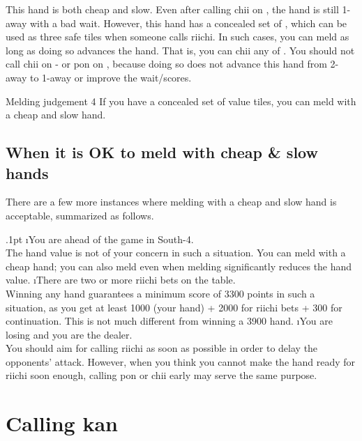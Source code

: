 \bigskip
This hand is both cheap and slow. Even after calling {\jap chii} on {\LARGE{}}, the hand is still 1-away with a bad wait. However, this hand has a concealed set of {\LARGE\zhong}, which can be used as three safe tiles when someone calls riichi. In such cases, you can meld as long as doing so advances the hand. That is, you can {\jap chii} any of {\LARGE{}}. You should not call {\jap chii} on {\LARGE{}-} or {\jap pon} on {\LARGE{}}, because doing so does not advance this hand from 2-away to 1-away or improve the wait/scores. 

\newpage
\color{MyRed}
\begin{itembox}[c]{Melding judgement 4}\normalcolor
If you have a concealed set of value tiles, you can meld with a cheap and slow hand.
\end{itembox}\normalcolor

\bigskip
\subsection{When it is OK to meld with cheap \& slow hands}
There are a few more instances where melding with a cheap and slow hand is acceptable, summarized as follows. 

\be\itemsep.1pt
\i You are ahead of the game in South-4.\\
The hand value is not of your concern in such a situation. You can meld with a cheap hand; you can also meld even when melding significantly reduces the hand value.
\i There are two or more riichi bets on the table.\\
Winning any hand guarantees a minimum score of 3300 points in such a situation, as you get at least 1000 (your hand) + 2000 for riichi bets + 300 for continuation. This is not much different from winning a 3900 hand.
\i You are losing and you are the dealer.\\
You should aim for calling riichi as soon as possible in order to delay the opponents' attack. However, when you think you cannot make the hand ready for riichi soon enough, calling {\jap pon} or {\jap chii} early may serve the same purpose. 
\ee

\newpage

\section{Calling {\jap kan}} \label{sec:kong}  

